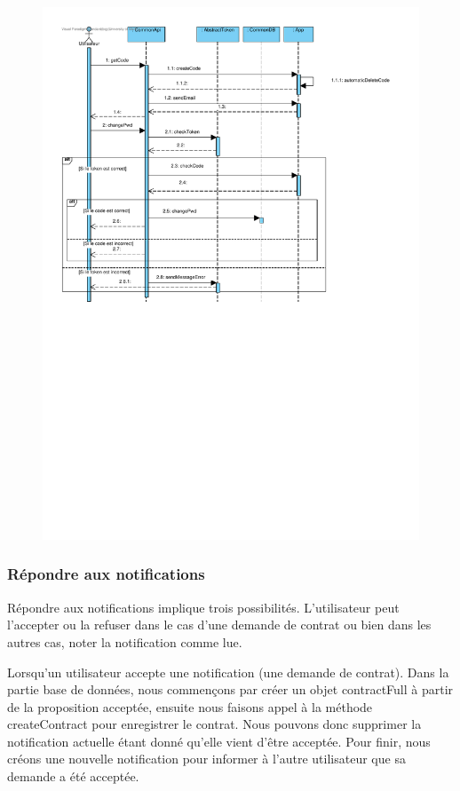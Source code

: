 \begin{figure}[h]
\centering
\includegraphics[height = 0.9\textwidth]{Base/sequence/img/common/Modifier son mot de passe.pdf}
\end{figure}

\newpage
\subsubsection{Répondre aux notifications}

\begin{flushleft}
Répondre aux notifications implique trois possibilités. L'utilisateur peut l'accepter ou la refuser dans le cas d'une demande de contrat ou bien dans les autres cas, noter la notification comme lue.
\end{flushleft}

\begin{flushleft}
Lorsqu'un utilisateur accepte une notification (une demande de contrat). Dans la partie base de données, nous commençons par créer un objet contractFull à partir de la proposition acceptée, ensuite nous faisons appel à la méthode createContract pour enregistrer le contrat. Nous pouvons donc supprimer la notification actuelle étant donné qu'elle vient d'être acceptée. Pour finir, nous créons une nouvelle notification pour informer à l'autre utilisateur que sa demande a été acceptée.
\end{flushleft}

